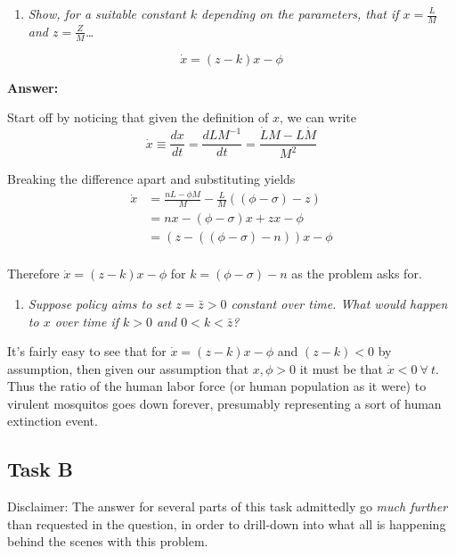 \documentclass[
]{article}
\providecommand{\tightlist}{%
  \setlength{\itemsep}{0pt}\setlength{\parskip}{0pt}}
\begin{document}
\begin{enumerate}
\def\labelenumi{\arabic{enumi}.}
\tightlist
\item
  \emph{Show, for a suitable constant \(k\) depending on the parameters,
  that if \(x = \frac{L}{M}\) and \(z = \frac{Z}{M}\)\ldots{}}
\end{enumerate}

\[ \dot{x} = (z-k)x - \phi \]

\textbf{Answer:}

Start off by noticing that given the definition of \(x\), we can write
\[\dot{x} \equiv \frac{dx}{dt} =  \frac{dLM^{-1}}{dt} = \frac{\dot{L}M - L\dot{M}}{M^2} \]

Breaking the difference apart and substituting yields \begin{align} 

\dot{x} &= \frac{nL - \phi M}{M} - \frac{L}{M}((\phi - \sigma) - z) \\
        &= nx - (\phi - \sigma)x + zx - \phi \\
        &= (z - ((\phi - \sigma )- n) )x - \phi \\
\end{align}

Therefore \(\dot{x} = (z-k)x - \phi\) for \(k = (\phi - \sigma) - n\) as
the problem asks for.

\begin{enumerate}
\def\labelenumi{\arabic{enumi}.}
\setcounter{enumi}{1}
\tightlist
\item
  \emph{Suppose policy aims to set \(z = \bar{z} > 0\) constant over
  time. What would happen to \(x\) over time if \(k>0\) and
  \(0<k<\bar{z}\)?}
\end{enumerate}

It's fairly easy to see that for \(\dot{x} = (z-k)x - \phi\) and
\((z-k)<0\) by assumption, then given our assumption that \(x,\phi > 0\)
it must be that \(\dot{x} < 0 \ \forall \ t\). Thus the ratio of the
human labor force (or human population as it were) to virulent mosquitos
goes down forever, presumably representing a sort of human extinction
event.

\hypertarget{task-b}{%
\subsection{Task B}\label{task-b}}

Disclaimer: The answer for several parts of this task admittedly go
\emph{much further} than requested in the question, in order to
drill-down into what all is happening behind the scenes with this
problem.
\end{document}
